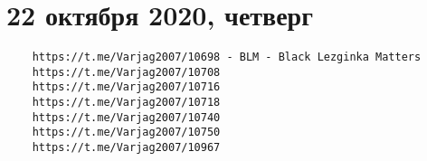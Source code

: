  
 

\section{22 октября 2020, четверг}
\label{sec:22_10_2020}




\begin{verbatim}
	https://t.me/Varjag2007/10698 - BLM - Black Lezginka Matters
	https://t.me/Varjag2007/10708
	https://t.me/Varjag2007/10716
	https://t.me/Varjag2007/10718
	https://t.me/Varjag2007/10740
	https://t.me/Varjag2007/10750
	https://t.me/Varjag2007/10967
\end{verbatim}
